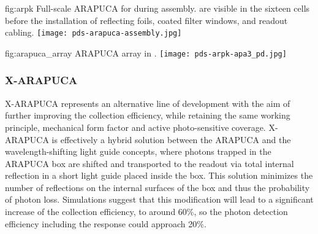 
\begin{dunefigure}{fig:arpk}
{Full-scale ARAPUCA for  during assembly.  are visible in the sixteen cells before the installation of reflecting foils, coated filter windows, and readout cabling. } 
\texttt{[image: pds-arapuca-assembly.jpg]}
\end{dunefigure}

\begin{dunefigure}{fig:arapuca_array}
{ARAPUCA array in .} 	
\texttt{[image: pds-arpk-apa3\_pd.jpg]} 
\end{dunefigure}


\subsubsection{X-ARAPUCA} 
\label{sssec:x-arapuca}
X-ARAPUCA represents  an alternative line of development with the aim of further improving the collection efficiency, while retaining the same working principle, mechanical form factor and active  photo-sensitive coverage. X-ARAPUCA is effectively a hybrid solution between the ARAPUCA and the wavelength-shifting light guide concepts, where photons trapped in the ARAPUCA box are shifted and transported to the readout via total internal reflection in a short light guide placed inside the box.
This solution minimizes the number of reflections on the internal surfaces of the box and thus the probability of photon loss. Simulations suggest that this modification will lead to a significant increase of the collection efficiency, to around 60\%, so the photon detection efficiency including the  response could approach 20\%. 

